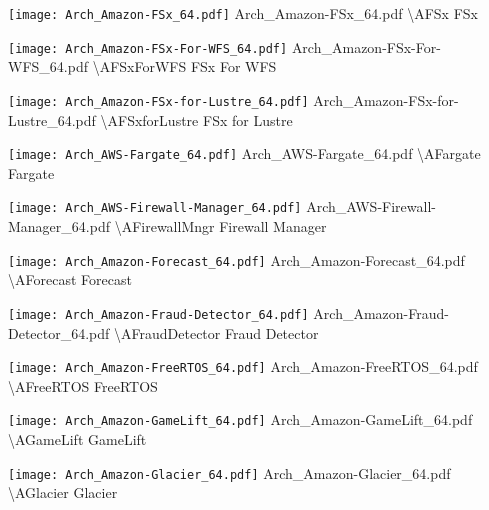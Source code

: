 {\texttt{[image: Arch\_Amazon-FSx\_64.pdf]}} {Arch\_Amazon-FSx\_64.pdf} {{\textbackslash}AFSx} {FSx}

 {\texttt{[image: Arch\_Amazon-FSx-For-WFS\_64.pdf]}} {Arch\_Amazon-FSx-For-WFS\_64.pdf} {{\textbackslash}AFSxForWFS} {FSx For WFS}

 {\texttt{[image: Arch\_Amazon-FSx-for-Lustre\_64.pdf]}} {Arch\_Amazon-FSx-for-Lustre\_64.pdf} {{\textbackslash}AFSxforLustre} {FSx for Lustre}

 {\texttt{[image: Arch\_AWS-Fargate\_64.pdf]}} {Arch\_AWS-Fargate\_64.pdf} {{\textbackslash}AFargate} {Fargate}

 {\texttt{[image: Arch\_AWS-Firewall-Manager\_64.pdf]}} {Arch\_AWS-Firewall-Manager\_64.pdf} {{\textbackslash}AFirewallMngr} {Firewall Manager}

 {\texttt{[image: Arch\_Amazon-Forecast\_64.pdf]}} {Arch\_Amazon-Forecast\_64.pdf} {{\textbackslash}AForecast} {Forecast}

 {\texttt{[image: Arch\_Amazon-Fraud-Detector\_64.pdf]}} {Arch\_Amazon-Fraud-Detector\_64.pdf} {{\textbackslash}AFraudDetector} {Fraud Detector}

 {\texttt{[image: Arch\_Amazon-FreeRTOS\_64.pdf]}} {Arch\_Amazon-FreeRTOS\_64.pdf} {{\textbackslash}AFreeRTOS} {FreeRTOS}

 {\texttt{[image: Arch\_Amazon-GameLift\_64.pdf]}} {Arch\_Amazon-GameLift\_64.pdf} {{\textbackslash}AGameLift} {GameLift}

 {\texttt{[image: Arch\_Amazon-Glacier\_64.pdf]}} {Arch\_Amazon-Glacier\_64.pdf} {{\textbackslash}AGlacier} {Glacier}

